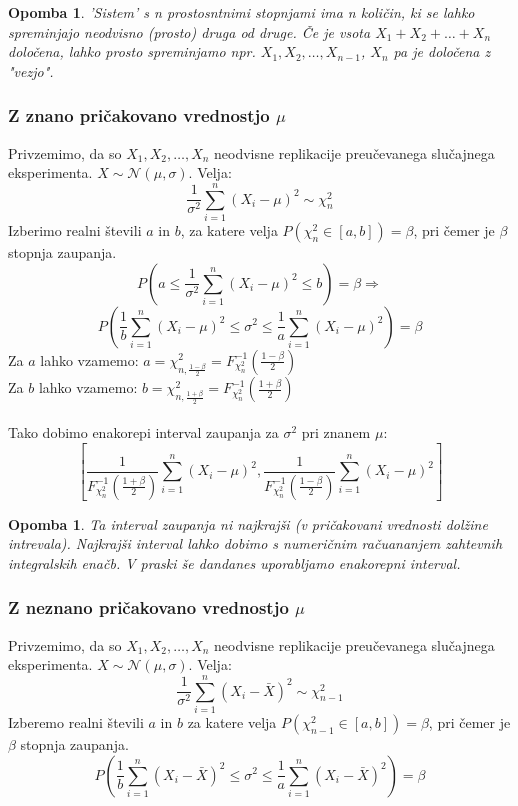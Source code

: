 \documentclass[11pt]{article}
\newtheorem{Opomba}[Izrek]{{\sc Opomba}}
\begin{document}
\begin{Opomba}
	'Sistem' s n prostosntnimi stopnjami ima n količin, ki se lahko spreminjajo neodvisno (prosto) druga od druge.
	Če je vsota $X_1+ X_2+ \ldots +X_n$ določena, lahko prosto spreminjamo npr. $X_1, X_2, \ldots ,X_{n-1}$, $X_n$ pa je določena z "vezjo".
\end{Opomba}
\subsubsection{Z znano pričakovano vrednostjo $\mu$}
Privzemimo, da so $X_1, X_2, \ldots , X_n$ neodvisne replikacije preučevanega slučajnega eksperimenta. $X\sim \mathcal{N}(\mu,\sigma)$. Velja:
$$\frac{1}{\sigma^2}\sum_{i = 1}^{n}{(X_i - \mu)^2} \sim \chi_n^2$$
Izberimo realni števili $a$ in $b$, za katere velja $P(\chi_n^2 \in [a,b]) = \beta$, pri čemer je $\beta$ stopnja zaupanja.
$$P(a \le \frac{1}{\sigma^2}\sum_{i = 1}^{n}{(X_i - \mu)^2} \le b) = \beta \Rightarrow$$
$$P\left( \frac{1}{b}\sum_{i = 1}^{n}{(X_i - \mu)^2}\le \sigma^2 \le  \frac{1}{a}\sum_{i = 1}^{n}{(X_i - \mu)^2}\right) = \beta$$
Za $a$ lahko vzamemo: $a = \chi^2_{n,\frac{1-\beta}{2}} = F_{\chi_n^2}^{-1}\left(\frac{1-\beta}{2}\right)$
\\
Za $b$ lahko vzamemo: $b = \chi^2_{n,\frac{1+\beta}{2}} = F_{\chi_n^2}^{-1}\left(\frac{1+\beta}{2}\right)$
\\
\\
Tako dobimo  enakorepi interval zaupanja za $\sigma^2$ pri znanem $\mu$:
$$\left[\frac{1}{F_{\chi_n^2}^{-1}\left(\frac{1+\beta}{2}\right)}\sum_{i = 1}^{n}{(X_i - \mu)^2}, \frac{1}{F_{\chi_n^2}^{-1}\left(\frac{1-\beta}{2}\right)}\sum_{i = 1}^{n}{(X_i - \mu)^2}\right]$$

\begin{Opomba}
	Ta interval zaupanja ni najkrajši (v pričakovani vrednosti dolžine intrevala). Najkrajši interval lahko dobimo s numeričnim račuananjem zahtevnih integralskih enačb. V praski še dandanes uporabljamo enakorepni interval.
\end{Opomba}
\subsubsection{Z neznano pričakovano vrednostjo $\mu$}
Privzemimo, da so $X_1, X_2, \ldots , X_n$ neodvisne replikacije preučevanega slučajnega eksperimenta. $X\sim \mathcal{N}(\mu,\sigma)$. Velja:
$$\frac{1}{\sigma^2}\sum_{i = 1}^{n}{(X_i - \bar{X})^2} \sim \chi_{n-1}^2$$
Izberemo realni števili $a$ in $b$ za katere velja $P(\chi_{n-1}^2 \in [a,b]) = \beta$, pri čemer je $\beta$ stopnja zaupanja.
$$P\left( \frac{1}{b}\sum_{i = 1}^{n}{(X_i - \bar{X})^2}\le \sigma^2 \le  \frac{1}{a}\sum_{i = 1}^{n}{(X_i - \bar{X})^2}\right) = \beta$$
\end{document}
